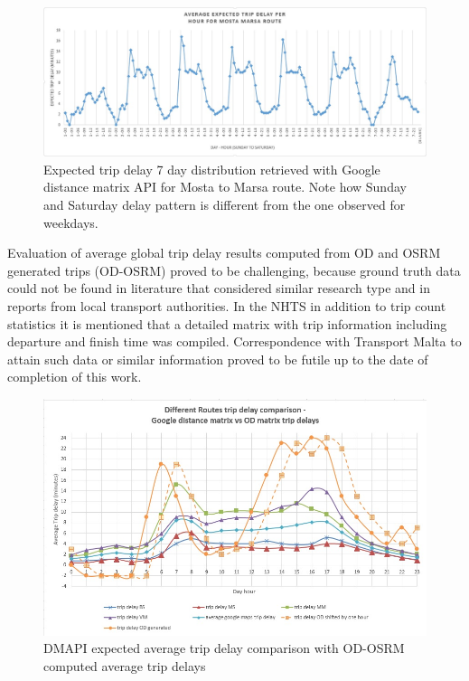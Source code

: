 \documentclass[12pt, a4paper]{report}
\theoremstyle{definition}
\theoremstyle{definition}%
\theoremstyle{definition}%
\theoremstyle{definition}%
\theoremstyle{definition}%
\theoremstyle{definition}%
\begin{document}
\begin{figure}[!]	
	\includegraphics[scale=0.5]{trip_delay_mosta_marsa.jpg}
	\centering
	\caption[Average expected trip delay - 7 day distibution]{Expected trip delay 7 day distribution retrieved with Google distance matrix API for Mosta to Marsa route. Note how Sunday and Saturday delay pattern is different from the one observed for weekdays.}
	\label{fig:trip_delay_mosta_marsa}
\end{figure}

Evaluation of average global trip delay results computed from OD and OSRM generated trips (OD-OSRM) proved to be challenging, because ground truth data could not be found in literature that considered similar research type and in reports from local transport authorities. In the NHTS \cite{malta2011national} in addition to trip count statistics it is mentioned that a detailed matrix with trip information including departure and finish time was compiled. Correspondence with Transport Malta to attain such data or similar information proved to be futile up to the date of completion of this work. 


\begin{figure}[h]	
	\includegraphics[scale=0.7]{trip_delay_comparison.jpg}
	\centering
	\caption[Trip delay line chart DMAPI vs OD-OSRM]{DMAPI expected average trip delay comparison with OD-OSRM computed average trip delays}
	\label{fig:trip_delay_google_vs_mine}
\end{figure}
\end{document}
